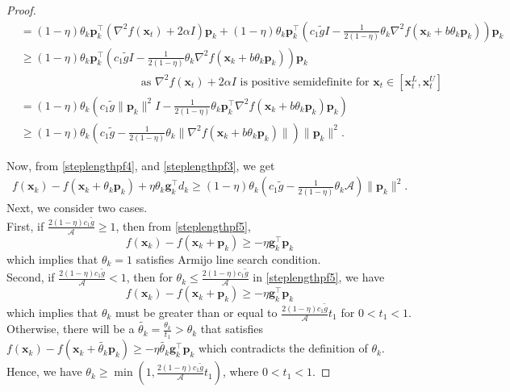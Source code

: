 \documentclass[10pt,a4paper]{amsart}
\begin{document}
\begin{proof}
\begin{align}
        &= (1-\eta)\theta_{k}\mathbf{p}^{\top}_{k}(\nabla^{2} f(\mathbf{x}_{t})+2\alpha I)\mathbf{p}_{k}+(1-\eta)\theta_{k}\mathbf{p}^{\top}_{k}\left(c_1\tilde gI-\frac{1}{2(1-\eta)}\theta_{k}\nabla^{2} f(\mathbf{x}_{k}+b\theta_{k}\mathbf{p}_{k})\right)\mathbf{p}_{k}\nonumber\\
        &\geq (1-\eta) \theta_{k} \mathbf{p}^{\top}_{k} \left(c_1\tilde gI-\frac{1}{2(1-\eta)}\theta_{k}\nabla^{2} f(\mathbf{x}_{k}+b\theta_{k}\mathbf{p}_{k})\right)\mathbf{p}_{k}\nonumber\\
        &~~~~~~~~~~~~~~~~~~~~~~~~~~~~~~~~~~~~~~~~~~~~~~~\text{ as }\nabla^{2} f(\mathbf{x}_{t})+2\alpha I \text{ is positive semidefinite  for }\mathbf{x}_{t}\in[\mathbf{x}^{L}_{t}, \mathbf{x}^{U}_{t}]\nonumber\\
        &=(1-\eta)\theta_{k}\left(c_1\tilde g\lVert \mathbf{p}_{k}\rVert^{2}I-\frac{1}{2(1-\eta)}\theta_{k}\mathbf{p}^{\top}_{k}\nabla^{2}f(\mathbf{x}_{k}+b\theta_{k}\mathbf{p}_{k})\mathbf{p}_{k}\right)\nonumber\\
        &\geq (1-\eta)\theta_{k}\left(c_1\tilde g-\frac{1}{2(1-\eta)}\theta_{k}\rVert\nabla^{2}f(\mathbf{x}_{k}+b\theta_{k}\mathbf{p}_{k})\rVert\right)\lVert \mathbf{p}_{k}\rVert^{2}.
    \end{align}
    
    Now, from  \eqref{steplengthpf4}, and \eqref{steplengthpf3}, we get 
    \begin{align}\label{steplengthpf5}
        f(\mathbf{x}_{k})-f(\mathbf{x}_{k}+\theta_{k}\mathbf{p}_{k})+\eta\theta_{k}\mathbf{g}^{\top}_{k}d_{k}\geq (1-\eta) \theta_{k} \left(c_1\tilde{g}-\frac{1}{2(1-\eta)}\theta_{k}\mathcal{A}\right)\lVert \mathbf{p}_{k}\rVert^{2}.
    \end{align}
Next, we consider two cases.\\
First, if $\frac{2(1-\eta)c_1\tilde{g}}{\mathcal{A}}\geq1$, then from \eqref{steplengthpf5}, 
\begin{equation*}
f(\mathbf{x}_{k})-f(\mathbf{x}_{k}+\mathbf{p}_k)\geq-\eta \mathbf{g}^{\top}_{k}\mathbf{p}_{k}
\end{equation*}
which implies that $\theta_{k}=1$ satisfies Armijo line search condition.\\
Second, if $\frac{2(1-\eta)c_1\tilde{g}}{\mathcal{A}}<1$, then for $\theta_{k}\leq \frac{2(1-\eta)c_1\tilde{g}}{\mathcal{A}}$ in \eqref{steplengthpf5}, we have 
\begin{equation}
    f(\mathbf{x}_{k})-f(\mathbf{x}_{k}+\mathbf{p}_k)\geq-\eta \mathbf{g}^{\top}_{k}\mathbf{p}_{k}
\end{equation}
which implies that $\theta_{k}$ must be greater than or equal to $\frac{2(1-\eta)c_1\tilde{g}}{\mathcal{A}}{t_1}$ for $0<t_1<1$. Otherwise, there will be a $\tilde{\theta_{k}}=\frac{\theta_{k}}{t_1}>\theta_{k}$ that 
satisfies 
$ f(\mathbf{x}_{k})-f(\mathbf{x}_{k}+\tilde{\theta_{k}}\mathbf{p}_k)\geq-\eta\tilde{\theta_{k}} \mathbf{g}^{\top}_{k}\mathbf{p}_{k}$ which contradicts the definition of $\theta_{k}$. Hence, we have $\theta_{k}\geq\min\left(1,\frac{2(1-\eta)c_1\tilde{g}}{\mathcal{A}}{t_1}\right)$, where  $0<t_1<1$. 
\end{proof}
\end{document}

